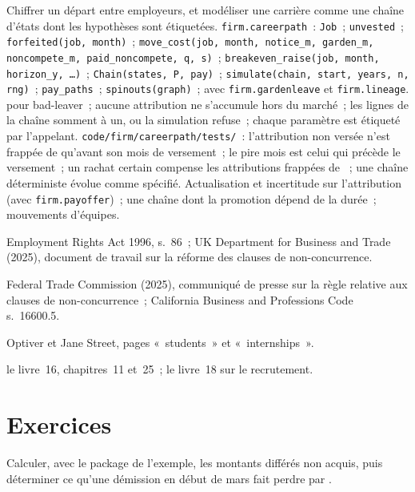 \begin{build}
 Chiffrer un départ entre employeurs, et modéliser une carrière comme une chaîne d'états dont les hypothèses sont étiquetées.
 \texttt{firm.careerpath}~: \texttt{Job}~; \texttt{unvested}~; \texttt{forfeited(job, month)}~;
\texttt{move\_cost(job, month, notice\_m, garden\_m, noncompete\_m, paid\_noncompete, q, s)}~;
\texttt{breakeven\_raise(job, month, horizon\_y, \dots)}~; \texttt{Chain(states, P, pay)}~;
\texttt{simulate(chain, start, years, n, rng)}~; \texttt{pay\_paths}~; \texttt{spinouts(graph)}~; avec \texttt{firm.gardenleave} et \texttt{firm.lineage}.
  pour bad-leaver~; aucune attribution ne s'accumule hors du marché~; les lignes de la chaîne somment à un, ou la simulation
refuse~; chaque paramètre est étiqueté par l'appelant.
 \texttt{code/firm/careerpath/tests/}~: l'attribution non versée n'est frappée de  qu'avant son
mois de versement~; le pire mois est celui qui précède le versement~; un rachat certain compense les attributions frappées de ~; une chaîne déterministe
évolue comme spécifié.
 Actualisation et incertitude sur l'attribution (avec \texttt{firm.payoffer})~; une chaîne dont la
promotion dépend de la durée~; mouvements d'équipes.
\end{build}

\begin{omsources}
\item Employment Rights Act 1996, s.~86~; UK Department for Business and Trade (2025), document de travail sur la réforme des clauses de non-concurrence.
\item Federal Trade Commission (2025), communiqué de presse sur la règle relative aux clauses de non-concurrence~; California Business and Professions Code
s.~16600.5.
\item Optiver et Jane Street, pages «~students~» et «~internships~».
\item le livre~16, chapitres~11 et~25~; le livre~18 sur le recrutement.
\end{omsources}

\section{Exercices}

\begin{exercise}[$\star$]\label{exo:in:career-paths-and-moves:1}
Calculer, avec le package de l'exemple, les montants différés non acquis, puis déterminer ce qu'une démission en début de mars fait perdre par .
\end{exercise}

